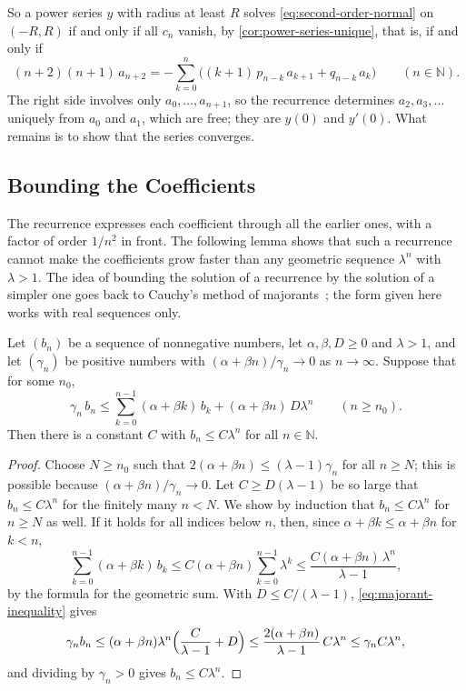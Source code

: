 So a power series $y$ with radius at least $R$ solves \eqref{eq:second-order-normal} on $(-R,R)$ if and only if all $c_n$ vanish, by \cref{cor:power-series-unique}, that is, if and only if
\begin{equation}
(n+2)(n+1)\,a_{n+2}=-\sum_{k=0}^n\bigl((k+1)\,p_{n-k}\,a_{k+1}+q_{n-k}\,a_k\bigr)\qquad(n\in\mathbb N).
\label{eq:ordinary-recurrence}
\end{equation}
The right side involves only $a_0,\ldots,a_{n+1}$, so the recurrence determines $a_2,a_3,\ldots$ uniquely from $a_0$ and $a_1$, which are free; they are $y(0)$ and $y'(0)$. What remains is to show that the series converges.

\subsection{Bounding the Coefficients}

The recurrence expresses each coefficient through all the earlier ones, with a factor of order $1/n^2$ in front. The following lemma shows that such a recurrence cannot make the coefficients grow faster than any geometric sequence $\lambda^n$ with $\lambda>1$. The idea of bounding the solution of a recurrence by the solution of a simpler one goes back to Cauchy's method of majorants~\cite[Chap.~2]{hille1976}; the form given here works with real sequences only.

\begin{lemma}
\label{lem:coefficient-growth}
Let $(b_n)$ be a sequence of nonnegative numbers, let $\alpha,\beta,D\ge0$ and $\lambda>1$, and let $(\gamma_n)$ be positive numbers with $(\alpha+\beta n)/\gamma_n\to0$ as $n\to\infty$. Suppose that for some $n_0$,
\begin{equation}
\gamma_n\,b_n\le\sum_{k=0}^{n-1}(\alpha+\beta k)\,b_k+(\alpha+\beta n)\,D\lambda^n\qquad(n\ge n_0).
\label{eq:majorant-inequality}
\end{equation}
Then there is a constant $C$ with $b_n\le C\lambda^n$ for all $n\in\mathbb N$.
\end{lemma}

\begin{proof}
Choose $N\ge n_0$ such that $2(\alpha+\beta n)\le(\lambda-1)\gamma_n$ for all $n\ge N$; this is possible because $(\alpha+\beta n)/\gamma_n\to0$. Let $C\ge D(\lambda-1)$ be so large that $b_n\le C\lambda^n$ for the finitely many $n<N$. We show by induction that $b_n\le C\lambda^n$ for $n\ge N$ as well. If it holds for all indices below $n$, then, since $\alpha+\beta k\le\alpha+\beta n$ for $k<n$,
\[
\sum_{k=0}^{n-1}(\alpha+\beta k)\,b_k\le C(\alpha+\beta n)\sum_{k=0}^{n-1}\lambda^k\le\frac{C(\alpha+\beta n)\,\lambda^n}{\lambda-1},
\]
by the formula for the geometric sum. With $D\le C/(\lambda-1)$, \eqref{eq:majorant-inequality} gives
\[
\gamma_nb_n\le(\alpha+\beta n)\lambda^n\Bigl(\frac C{\lambda-1}+D\Bigr)\le\frac{2(\alpha+\beta n)}{\lambda-1}\,C\lambda^n\le\gamma_nC\lambda^n,
\]
and dividing by $\gamma_n>0$ gives $b_n\le C\lambda^n$.
\end{proof}

